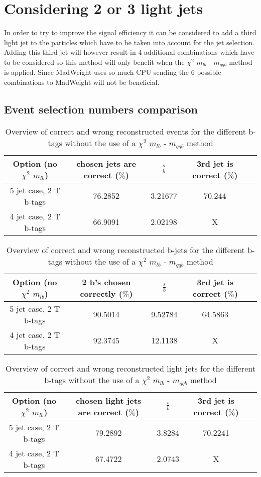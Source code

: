 \documentclass[a4paper,12pt]{report}
\begin{document}
\newpage
\section{Considering 2 or 3 light jets}
In order to try to improve the signal efficiency it can be considered to add a third light jet to the particles which have to be taken into account for the jet selection. Adding this third jet will however result in 4 additional combinations which have to be considered so this method will only benefit when the $\chi^{2}$ $m_{lb}$ - $m_{qqb}$ method is applied. Since MadWeight uses so much CPU sending the $6$ possible combinations to MadWeight will not be beneficial.
\subsection{Event selection numbers comparison}
 \begin{table}[!h] 
 \begin{tabular}{c|c|c|c|c} 
\textbf{Option} (no $\chi^{2}$ $m_{lb}$) & chosen jets are correct ($\%$)       & $\frac{s}{b}$ & 3rd jet is correct ($\%$) \\ \hline 
 5 jet case, 2 T b-tags              & 76.2852 & 3.21677 & 70.244\\ 
 4 jet case, 2 T b-tags              & 66.9091 & 2.02198 & X \\ 
 \end{tabular} 
\caption{Overview of correct and wrong reconstructed events for the different b-tags without the use of a $\chi^{2}$ $m_{lb}$ - $m_{qqb}$ method} 
 \end{table} 
 
 \begin{table}[!h] 
 \begin{tabular}{c|c|c|c|c} 
\textbf{Option} (no $\chi^{2}$ $m_{lb}$) & 2 b's chosen correctly ($\%$)        & $\frac{s}{b}$ & 3rd jet is correct ($\%$) \\ \hline 
 5 jet case, 2 T b-tags              & 90.5014 & 9.52784 & 64.5863\\ 
 4 jet case, 2 T b-tags              & 92.3745 & 12.1138 & X \\ 
 \end{tabular} 
\caption{Overview of correct and wrong reconstructed b-jets for the different b-tags without the use of a $\chi^{2}$ $m_{lb}$ - $m_{qqb}$ method} 
 \end{table} 
 
 \begin{table}[!h] 
 \begin{tabular}{c|c|c|c|c} 
\textbf{Option} (no $\chi^{2}$ $m_{lb}$) & chosen light jets are correct ($\%$) & $\frac{s}{b}$ & 3rd jet is correct ($\%$) \\ \hline 
 5 jet case, 2 T b-tags              & 79.2892 & 3.8284 & 70.2241\\ 
 4 jet case, 2 T b-tags              & 67.4722 & 2.0743 & X \\ 
 \end{tabular} 
\caption{Overview of correct and wrong reconstructed light jets for the different b-tags without the use of a $\chi^{2}$ $m_{lb}$ - $m_{qqb}$ method} 
 \end{table} 
\end{document}
